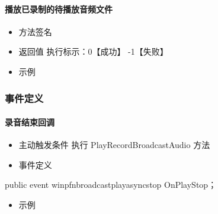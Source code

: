 \documentclass[letterpaper,10pt,english]{sphinxmanual}
\begin{document}
\paragraph{播放已录制的待播放音频文件}
\label{\detokenize{csharp:id64}}\begin{itemize}
\item {} 
方法签名

\end{itemize}

%
\begin{sphinxVerbatim}[commandchars=\\\{\}]
  
\end{sphinxVerbatim}
\begin{itemize}
\item {} 
返回值 执行标示：0【成功】 -1【失败】

\item {} 
示例

\end{itemize}

%
\begin{sphinxVerbatim}[commandchars=\\\{\}]
   
\end{sphinxVerbatim}


\subsubsection{事件定义}
\label{\detokenize{csharp:id65}}

\paragraph{录音结束回调}
\label{\detokenize{csharp:id66}}\begin{itemize}
\item {} 
主动触发条件 执行 PlayRecordBroadcastAudio 方法

\item {} 
事件定义

\end{itemize}

%
\begin{sphinxVerbatim}[commandchars=\\\{\}]
public event win\PYGZus{}pfn\PYGZus{}broadcast\PYGZus{}play\PYGZus{}async\PYGZus{}stop OnPlayStop；
\end{sphinxVerbatim}
\begin{itemize}
\item {} 
示例

\end{itemize}
\end{document}
